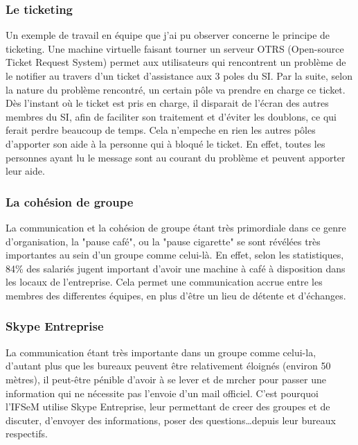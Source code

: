 \subsubsection{Le ticketing}
Un exemple de travail en équipe que j'ai pu observer concerne le principe de ticketing. Une machine virtuelle faisant tourner un serveur OTRS (Open-source Ticket Request System) permet aux utilisateurs qui rencontrent un problème de le notifier au travers d'un ticket d'assistance aux 3 poles du SI. Par la suite, selon la nature du problème rencontré, un certain pôle va prendre en charge ce ticket. Dès l'instant où le ticket est pris en charge, il disparait de l'écran des autres membres du SI, afin de faciliter son traitement et d'éviter les doublons, ce qui ferait perdre beaucoup de temps. Cela n'empeche en rien les autres pôles d'apporter son aide à la personne qui à bloqué le ticket. En effet, toutes les personnes ayant lu le message sont au courant du problème et peuvent apporter leur aide.

\subsubsection{La cohésion de groupe}
La communication et la cohésion de groupe étant très primordiale dans ce genre d'organisation, la "pause café", ou la "pause cigarette" se sont révélées très importantes au sein d'un groupe comme celui-là. En effet, selon les statistiques, 84\% des salariés jugent important d'avoir une machine à café à disposition dans les locaux de l'entreprise. Cela permet une communication accrue entre les membres des differentes équipes, en plus d'être un lieu de détente et d'échanges.  

\subsubsection{Skype Entreprise}
La communication étant très importante dans un groupe comme celui-la, d'autant plus que les bureaux peuvent être relativement éloignés (environ 50 mètres), il peut-être pénible d'avoir à se lever et de mrcher pour passer une information qui ne nécessite pas l'envoie d'un mail officiel. C'est pourquoi l'IFSeM utilise Skype Entreprise, leur permettant de creer des groupes et de discuter, d'envoyer des informations, poser des questions\dots depuis leur bureaux respectifs.
